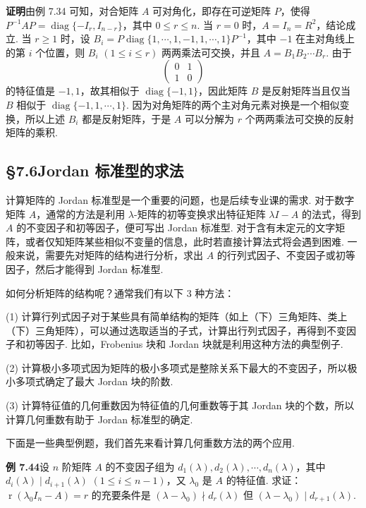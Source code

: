 \documentclass[UTF8, 12pt, fontset=fandol, oneside]{ctexart}
\begin{document}
\noindent\textbf{证明}\quad 由例 7.34 可知，对合矩阵 $A$ 可对角化，即存在可逆矩阵 $P$，使得 $P^{-1}AP=\operatorname{diag}\{-I_r,I_{n-r}\}$，其中 $0\le r\le n$. 当 $r=0$ 时，$A=I_n=R^2$，结论成立. 当 $r\ge 1$ 时，设 $B_i=P\operatorname{diag}\{1,\cdots,1,-1,1,\cdots,1\}P^{-1}$，其中 $-1$ 在主对角线上的第 $i$ 个位置，则 $B_i$ $(1\le i\le r)$ 两两乘法可交换，并且 $A=B_1B_2\cdots B_r$. 由于
\[
\left(\begin{array}{cc}
0 & 1\\
1 & 0
\end{array}\right)
\]
的特征值是 $-1,1$，故其相似于 $\operatorname{diag}\{-1,1\}$，因此矩阵 $B$ 是反射矩阵当且仅当 $B$ 相似于 $\operatorname{diag}\{-1,1,\cdots,1\}$. 因为对角矩阵的两个主对角元素对换是一个相似变换，所以上述 $B_i$ 都是反射矩阵，于是 $A$ 可以分解为 $r$ 个两两乘法可交换的反射矩阵的乘积.

\subsection*{§7.6\quad Jordan 标准型的求法}

计算矩阵的 Jordan 标准型是一个重要的问题，也是后续专业课的需求. 对于数字矩阵 $A$，通常的方法是利用 $\lambda$-矩阵的初等变换求出特征矩阵 $\lambda I-A$ 的法式，得到 $A$ 的不变因子和初等因子，便可写出 Jordan 标准型. 对于含有未定元的文字矩阵，或者仅知矩阵某些相似不变量的信息，此时若直接计算法式将会遇到困难. 一般来说，需要先对矩阵的结构进行分析，求出 $A$ 的行列式因子、不变因子或初等因子，然后才能得到 Jordan 标准型.

如何分析矩阵的结构呢？通常我们有以下 3 种方法：

(1) 计算行列式因子\quad 对于某些具有简单结构的矩阵（如上（下）三角矩阵、类上（下）三角矩阵），可以通过选取适当的子式，计算出行列式因子，再得到不变因子和初等因子. 比如，Frobenius 块和 Jordan 块就是利用这种方法的典型例子.

(2) 计算极小多项式\quad 因为矩阵的极小多项式是整除关系下最大的不变因子，所以极小多项式确定了最大 Jordan 块的阶数.

(3) 计算特征值的几何重数\quad 因为特征值的几何重数等于其 Jordan 块的个数，所以计算几何重数有助于 Jordan 标准型的确定.

下面是一些典型例题，我们首先来看计算几何重数方法的两个应用.

\noindent\textbf{例 7.44}\quad 设 $n$ 阶矩阵 $A$ 的不变因子组为 $d_1(\lambda),d_2(\lambda),\cdots,d_n(\lambda)$，其中 $d_i(\lambda)\mid d_{i+1}(\lambda)$ $(1\le i\le n-1)$，又 $\lambda_0$ 是 $A$ 的特征值. 求证：$\operatorname{r}(\lambda_0I_n-A)=r$ 的充要条件是 $(\lambda-\lambda_0)\nmid d_r(\lambda)$ 但 $(\lambda-\lambda_0)\mid d_{r+1}(\lambda)$.
\end{document}
